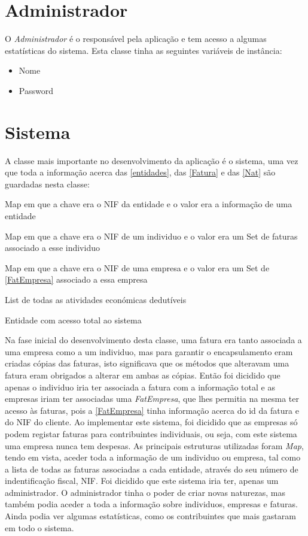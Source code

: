 \documentclass[10pt, a4paper]{report}
\begin{document}
\section{Administrador}\label{Admin}

O \emph{Administrador} é o responsável pela aplicação e tem acesso a algumas estatísticas do sistema. Esta classe tinha as seguintes variáveis de instância:

\begin{itemize}
	\item Nome
	\item Password
\end{itemize}

\section{Sistema}\label{Sistema}

A classe mais importante no desenvolvimento da aplicação é o sistema, uma vez que toda a informação acerca das \ref{entidades}, das \ref{Fatura} e das \ref{Nat} são guardadas nesta classe:

\begin{description}[align=left]
	\item [info] Map em que a chave era o NIF da entidade e o valor era a informação de uma entidade
	\item [sistema] Map em que a chave era o NIF de um individuo e o valor era um Set de faturas associado a esse individuo
	\item [empFaturas] Map em que a chave era o NIF de uma empresa e o valor era um Set de \ref{FatEmpresa} associado a essa empresa
	\item [natureza] List de todas as atividades económicas dedutíveis
	\item [admin] Entidade com acesso total ao sistema
\end{description}

Na fase inicial do desenvolvimento desta classe, uma fatura era tanto associada a uma empresa como a um individuo, mas para garantir o encapsulamento eram criadas cópias das faturas, isto significava que os métodos que alteravam uma fatura eram obrigados a alterar em ambas as cópias. Então foi dicidido que apenas o individuo iria ter associada a fatura com a informação total e as empresas iriam ter associadas uma \emph{FatEmpresa}, que lhes permitia na mesma ter acesso às faturas, pois a \ref{FatEmpresa} tinha informação acerca do id da fatura e do NIF do cliente. Ao implementar este sistema, foi dicidido que as empresas só podem registar faturas para contribuintes individuais, ou seja, com este sistema uma empresa nunca tem despesas.
As principais estruturas utilizadas foram \emph{Map}, tendo em vista, aceder toda a informação de um individuo ou empresa, tal como a lista de todas as faturas associadas a cada entidade, através do seu número de indentificação fiscal, NIF.
Foi dicidido que este sistema iria ter, apenas um administrador. O administrador tinha o poder de criar novas naturezas, mas também podia aceder a toda a informação sobre individuos, empresas e faturas. Ainda podia ver algumas estatísticas, como os contribuintes que mais gastaram em todo o sistema.
\end{document}
